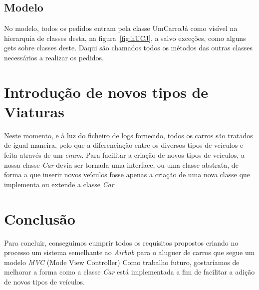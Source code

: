 \documentclass[a4paper]{report}
\begin{document}
\section{Modelo}

No modelo, todos os pedidos entram pela classe UmCarroJá como visível na hierarquia de classes desta,
na figura~\ref{fig:hUCJ}, a salvo exceções, como alguns gets sobre classes deste. Daqui são chamados
todos os métodos das outras classes necessários a realizar os pedidos.

\chapter{Introdução de novos tipos de Viaturas}

Neste momento, e à luz do ficheiro de logs fornecido, todos os carros são tratados de igual maneira,
pelo que a diferenciação entre os diversos tipos de veículos e feita através de um \textit{enum}.
Para facilitar a criação de novos tipos de veículos, a nossa classe \textit{Car} 
devia ser tornada uma interface, ou uma classe abstrata, de forma a que inserir novos veículos fosse
apenas a criação de uma nova classe que implementa ou extende a classe \textit{Car}

\chapter{Conclusão}

Para concluir, conseguimos cumprir todos os requisitos propostos criando no processo um
sistema semelhante ao \textit{Airbnb} para o aluguer de carros que segue um modelo \textit{MVC} (Mode View Controller)
Como trabalho futuro, gostaríamos de melhorar a forma como a classe \textit{Car} está implementada a fim
de facilitar a adição de novos tipos de veículos. 
\end{document}
